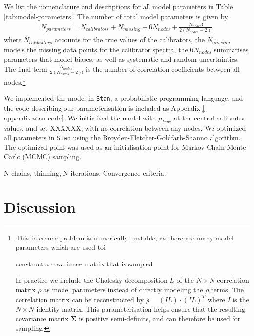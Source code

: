 \documentclass[preprint]{aastex}
\begin{document}
We list the nomenclature and descriptions for all model parameters in Table 
\ref{tab:model-parameters}. The number of total model parameters is given by
\begin{eqnarray}
    N_{parameters} = N_{calibrators} + N_{missing} + 6N_{nodes} + \frac{N_{nodes}!}{2(N_{nodes} - 2)!}
\end{eqnarray}
where $N_{calibrators}$ accounts for the true values of the calibrators, the
$N_{missing}$ models the missing data points for the calibrator spectra, the
$6N_{nodes}$ summarises parameters that model biases, as well as systematic
and random uncertainties. The final term $\frac{N_{nodes}!}{2(N_{nodes} - 2)!}$
is the number of correlation coefficients between all nodes.\footnote{
This inference problem is numerically unstable, as there are many model parameters
which are used toi


 construct a covariance matrix that is sampled


In practice
we include the Cholesky decomposition $L$ of the $N \times N$ correlation matrix $\rho$
as model parameters instead of directly modeling the $\rho$ terms.  The correlation
matrix can be reconstructed by $\rho = (IL)\cdot(IL)^T$ where $I$ is the $N \times N$
identity matrix. This parameterisation helps ensure that the resulting covariance
matrix $\mathbf{\Sigma}$ is positive semi-definite, and can therefore be used for
sampling.} 



We implemented the model in \texttt{Stan}, a probabilistic programming
language, and the code describing our parameterisation is included as Appendix \ref{
appendix:stan-code}. We initialised the model with $\mu_{true}$ at the central
calibrator values, and set XXXXXX, with no correlation between any nodes. We
optimized all parameters in \texttt{Stan} using the Broyden-Fletcher-Goldfarb-Shanno
algorithm. The optimized point was used as an initialisation point for Markov Chain
Monte-Carlo (MCMC) sampling.

N chains, thinning, N iterations. Convergence criteria.
 
 







\section{Discussion}
\label{sec:discussion}
\end{document}
